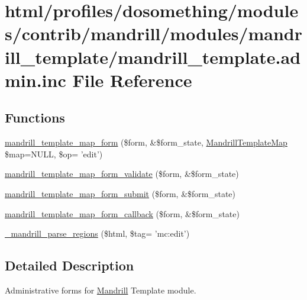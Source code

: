 \hypertarget{mandrill__template_8admin_8inc}{
\section{html/profiles/dosomething/modules/contrib/mandrill/modules/mandrill\_\-template/mandrill\_\-template.admin.inc File Reference}
\label{mandrill__template_8admin_8inc}
}
\subsection*{Functions}
\begin{DoxyCompactItemize}
\item 
\hyperlink{mandrill__template_8admin_8inc_ac57659a507efa477f482968d94e19cef}{mandrill\_\-template\_\-map\_\-form} (\$form, \&\$form\_\-state, \hyperlink{classMandrillTemplateMap}{MandrillTemplateMap} \$map=NULL, \$op= 'edit')
\item 
\hyperlink{mandrill__template_8admin_8inc_a028364729670c5c1b004ee7008cde808}{mandrill\_\-template\_\-map\_\-form\_\-validate} (\$form, \&\$form\_\-state)
\item 
\hyperlink{mandrill__template_8admin_8inc_aae04ec915ad905ac6c39679e543eff56}{mandrill\_\-template\_\-map\_\-form\_\-submit} (\$form, \&\$form\_\-state)
\item 
\hyperlink{mandrill__template_8admin_8inc_a81e130e132ad33ff656653ae6b93fe0f}{mandrill\_\-template\_\-map\_\-form\_\-callback} (\$form, \&\$form\_\-state)
\item 
\hyperlink{mandrill__template_8admin_8inc_a81a803bf15fe218cc61b3706a9334848}{\_\-mandrill\_\-parse\_\-regions} (\$html, \$tag= 'mc:edit')
\end{DoxyCompactItemize}


\subsection{Detailed Description}
Administrative forms for \hyperlink{classMandrill}{Mandrill} Template module. 

